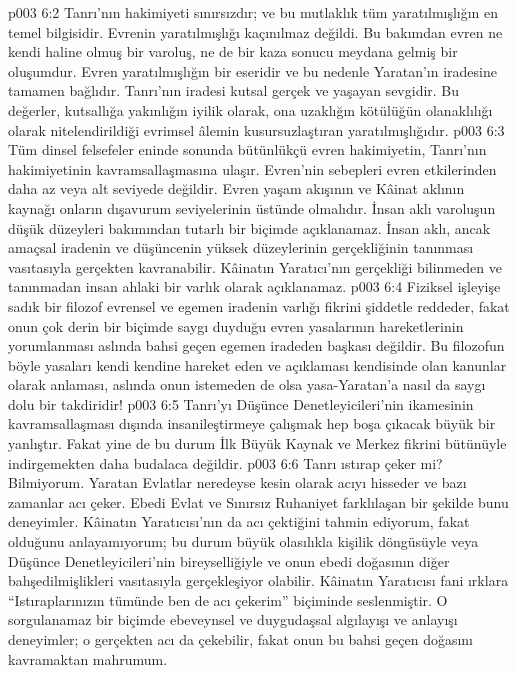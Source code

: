 \vs p003 6:2 Tanrı’nın hakimiyeti sınırsızdır; ve bu mutlaklık tüm yaratılmışlığın en temel bilgisidir. Evrenin yaratılmışlığı kaçınılmaz değildi. Bu bakımdan evren ne kendi haline olmuş bir varoluş, ne de bir kaza sonucu meydana gelmiş bir oluşumdur. Evren yaratılmışlığın bir eseridir ve bu nedenle Yaratan’ın iradesine tamamen bağlıdır. Tanrı’nın iradesi kutsal gerçek ve yaşayan sevgidir. Bu değerler, kutsallığa yakınlığın iyilik olarak, ona uzaklığın kötülüğün olanaklılığı olarak nitelendirildiği evrimsel âlemin kusursuzlaştıran yaratılmışlığıdır.
\vs p003 6:3 Tüm dinsel felsefeler eninde sonunda bütünlükçü evren hakimiyetin, Tanrı’nın hakimiyetinin kavramsallaşmasına ulaşır. Evren’nin sebepleri evren etkilerinden daha az veya alt seviyede değildir. Evren yaşam akışının ve Kâinat aklının kaynağı onların dışavurum seviyelerinin üstünde olmalıdır. İnsan aklı varoluşun düşük düzeyleri bakımından tutarlı bir biçimde açıklanamaz. İnsan aklı, ancak amaçsal iradenin ve düşüncenin yüksek düzeylerinin gerçekliğinin tanınması vasıtasıyla gerçekten kavranabilir. Kâinatın Yaratıcı’nın gerçekliği bilinmeden ve tanınmadan insan ahlaki bir varlık olarak açıklanamaz.
\vs p003 6:4 Fiziksel işleyişe sadık bir filozof evrensel ve egemen iradenin varlığı fikrini şiddetle reddeder, fakat onun çok derin bir biçimde saygı duyduğu evren yasalarının hareketlerinin yorumlanması aslında bahsi geçen egemen iradeden başkası değildir. Bu filozofun böyle yasaları kendi kendine hareket eden ve açıklaması kendisinde olan kanunlar olarak anlaması, aslında onun istemeden de olsa yasa\hyp{}Yaratan’a nasıl da saygı dolu bir takdiridir!
\vs p003 6:5 Tanrı’yı Düşünce Denetleyicileri’nin ikamesinin kavramsallaşması dışında insanileştirmeye çalışmak hep boşa çıkacak büyük bir yanlıştır. Fakat yine de bu durum İlk Büyük Kaynak ve Merkez fikrini bütünüyle  indirgemekten daha budalaca değildir.
\vs p003 6:6 Tanrı ıstırap çeker mi? Bilmiyorum. Yaratan Evlatlar neredeyse kesin olarak acıyı hisseder ve bazı zamanlar acı çeker. Ebedi Evlat ve Sınırsız Ruhaniyet farklılaşan bir şekilde bunu deneyimler. Kâinatın Yaratıcısı’nın da acı çektiğini tahmin ediyorum, fakat  olduğunu anlayamıyorum; bu durum büyük olasılıkla kişilik döngüsüyle veya Düşünce Denetleyicileri’nin bireyselliğiyle ve onun ebedi doğasının diğer bahşedilmişlikleri vasıtasıyla gerçekleşiyor olabilir. Kâinatın Yaratıcısı fani ırklara “Istıraplarınızın tümünde ben de acı çekerim” biçiminde seslenmiştir. O sorgulanamaz bir biçimde ebeveynsel ve duygudaşsal algılayışı ve anlayışı deneyimler; o gerçekten acı da çekebilir, fakat onun bu bahsi geçen doğasını kavramaktan mahrumum.
